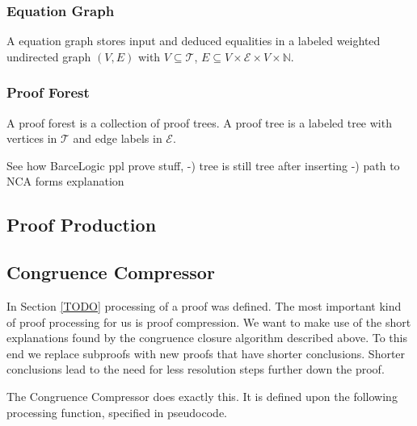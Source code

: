 \subsubsection*{Equation Graph}

A equation graph stores input and deduced equalities in a labeled weighted undirected graph $(V,E)$ with 
$V \subseteq \mathcal{T}$, $E \subseteq V \times \mathcal{E} \times V \times \mathbb{N}$.





\FloatBarrier

\subsubsection*{Proof Forest}

A proof forest is a collection of proof trees.
A proof tree is a labeled tree with vertices in $\mathcal{T}$ and edge labels in $\mathcal{E}$.



See how BarceLogic ppl prove stuff,
-) tree is still tree after inserting
-) path to NCA forms explanation

\FloatBarrier

\subsection*{Proof Production}



\FloatBarrier

\subsection*{Congruence Compressor}

In Section \ref{TODO} processing of a proof was defined.
The most important kind of proof processing for us is proof compression.
We want to make use of the short explanations found by the congruence closure algorithm described above.
To this end we replace subproofs with new proofs that have shorter conclusions.
Shorter conclusions lead to the need for less resolution steps further down the proof.

The Congruence Compressor does exactly this. It is defined upon the following processing function, specified in pseudocode.

